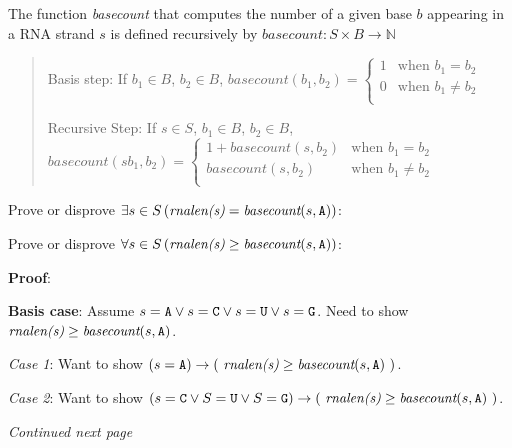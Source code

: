 \documentclass[12pt, oneside]{article}
\begin{document}
\vspace{-20pt}

The function \textit{basecount} that computes the number of a given base $b$ appearing in a RNA strand $s$ is defined recursively by $basecount : S \times B \to\mathbb{N}$

\vspace{-20pt}

\begin{quote}
Basis step: If  $b_1 \in B$, $b_2 \in B$, $basecount(b_1, b_2) =
        \begin{cases}
            1 & \textrm{when } b_1 = b_2 \\
            0 & \textrm{when } b_1 \neq b_2 \\
        \end{cases}$

Recursive Step: If $s \in S$, $b_1 \in B$, $b_2 \in B$, $basecount(s b_1, b_2) =
        \begin{cases}
            1 + \textit{basecount}(s, b_2) & \textrm{when } b_1 = b_2 \\
            \textit{basecount}(s, b_2) & \textrm{when } b_1 \neq b_2 \\
        \end{cases}$
\end{quote}

\vspace{-20pt}

Prove or disprove $\exists s \in S \, (\textit{rnalen(s)} = \textit{basecount}(s, \texttt{A}))$:

\vfill

Prove or disprove $\forall s \in S \, (\textit{rnalen(s)} \geq \textit{basecount}(s, \texttt{A}))$:

{\bf Proof}: 

{\bf Basis case}: Assume $s = \texttt{A} \lor s = \texttt{C} \lor s = \texttt{U} \lor s = \texttt{G}$. 
Need to show $\textit{rnalen(s)} \geq \textit{basecount}(s, \texttt{A})$.

{\it Case 1}: Want to show $(s = \texttt{A}) \to (~\textit{rnalen(s)} \geq \textit{basecount}(s, \texttt{A})~)$.

\vfill

{\it Case 2}: Want to show $(s = \texttt{C} \lor S = \texttt{U} \lor S = \texttt{G}) \to (~\textit{rnalen(s)} \geq \textit{basecount}(s, \texttt{A})~)$.

\vfill

\vfill

{\it Continued next page} 
\end{document}
